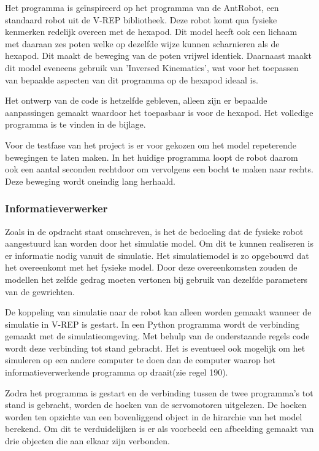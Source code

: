 \documentclass[10pt,a4paper]{article}
\begin{document}
Het programma is geïnspireerd op het programma van de AntRobot, een standaard robot uit de V-REP bibliotheek. Deze robot komt qua fysieke kenmerken redelijk overeen met de hexapod. Dit model heeft ook een lichaam met daaraan zes poten welke op dezelfde wijze kunnen scharnieren als de hexapod. Dit maakt de beweging van de poten vrijwel identiek. Daarnaast maakt dit model eveneens gebruik van 'Inversed Kinematics', wat voor het toepassen van bepaalde aspecten van dit programma op de hexapod ideaal is.

Het ontwerp van de code is hetzelfde gebleven, alleen zijn er bepaalde aanpassingen gemaakt waardoor het toepasbaar is voor de hexapod. Het volledige programma is te vinden in de bijlage. 

Voor de testfase van het project is er voor gekozen om het model repeterende bewegingen te laten maken. In het huidige programma loopt de robot daarom ook een aantal seconden rechtdoor om vervolgens een bocht te maken naar rechts. Deze beweging wordt oneindig lang herhaald.


\subsubsection{Informatieverwerker}
Zoals in de opdracht staat omschreven, is het de bedoeling dat de fysieke robot aangestuurd kan worden door het simulatie model. Om dit te kunnen realiseren is er informatie nodig vanuit de simulatie. Het simulatiemodel is zo opgebouwd dat het overeenkomt met het fysieke model. Door deze overeenkomsten zouden de modellen het zelfde gedrag moeten vertonen bij gebruik van dezelfde parameters van de gewrichten.

De koppeling van simulatie naar de robot kan alleen worden gemaakt wanneer de simulatie in V-REP is gestart. In een Python programma wordt de verbinding gemaakt met de simulatieomgeving. Met behulp van de onderstaande regels code wordt deze verbinding tot stand gebracht. Het is eventueel ook mogelijk om het simuleren op een andere computer te doen dan de computer waarop het informatieverwerkende programma op draait(zie regel 190).



Zodra het programma is gestart en de verbinding tussen de twee programma's tot stand is gebracht, worden de hoeken van de servomotoren uitgelezen. De hoeken worden ten opzichte van een bovenliggend object in de hirarchie van het model berekend. Om dit te verduidelijken is er als voorbeeld een afbeelding gemaakt van drie objecten die aan elkaar zijn verbonden.
\end{document}
